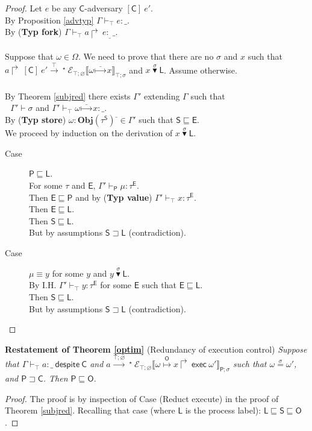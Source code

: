 \documentclass{sigplanconf}
\newcommand{\lab}{\mathsf L}
\newcommand{\labp}{\mathsf P}
\newcommand{\labo}{\mathsf O}
\newcommand{\labb}{\mathsf S}
\newcommand{\labt}{\mathsf E}
\newcommand{\labc}{\mathsf C}
\newcommand{\action}[1]{\stackrel{#1}{\longrightarrow}~}
\newcommand{\fork}[2]{#1\Rsh\:\!#2}
\newcommand{\store}[1]{\stackrel{#1}\mapsto}
\newcommand{\llctx}[3]{\mathcal E_{#1}\llbracket#2\rrbracket_{#3}}
\newcommand{\trule}[1]{(\textbf{Typ #1})}
\begin{document}
\begin{proof} Let $e$ be any $\labc$-adversary $[\labc]~e'$. \\
By Proposition \ref{advtyp} $\Gamma \vdash_{\top} e : \_$. \\
By \trule{fork} $\Gamma \vdash_\top \fork a e :_{\_} \_$. \\
\\
Suppose that $\omega \in \Omega$. We need to prove that there are no $\sigma$ and $x$ such that $\fork a [\labc]~e'\action{\top}\!\!\!\!{}^\star~ \llctx{\top;\varnothing}{\omega\store{\_} x}{\top;\sigma}$
and $x\stackrel\sigma\blacktriangledown \lab$. Assume otherwise.\\
\\
By Theorem \ref{subjred} there exists $\Gamma'$ extending $\Gamma$ such that \\
$~~~\Gamma' \vdash \sigma$ and $\Gamma' \vdash_\top \omega \store\_ x : \_$.\\
By \trule{store} $\omega : \mathbf{Obj}(\tau^{\labb})^\_ \in \Gamma'$ such that $\labb \sqsubseteq \labt$.\\
We proceed by induction on the derivation of $x\stackrel\sigma\blacktriangledown \lab$.
\begin{description}
\item[Case] $\labp \sqsubseteq \lab$.\\
For some $\tau$ and $\labt$, $\Gamma' \vdash_{\labp} \mu : \tau^{\labt}$.\\
Then $\labt \sqsubseteq \labp$ and by \trule{value} $\Gamma' \vdash_{\top} x : \tau^{\labt}$.\\
Then $\labt \sqsubseteq \lab$.\\
Then $\labb \sqsubseteq \lab$.\\
But by assumptions $\labb \sqsupset \lab$ (contradiction).
\item[Case] $\mu \equiv y$ for some $y$ and $y\stackrel\sigma\blacktriangledown \lab$.\\
By I.H. $\Gamma' \vdash_{\top} y : \tau^{\labt}$ for some $\labt$ such that $\labt \sqsubseteq \lab$.\\
Then $\labb \sqsubseteq \lab$.\\
But by assumptions $\labb \sqsupset \lab$ (contradiction). \qedhere
\end{description}
\end{proof}
\noindent
{\bf Restatement of Theorem \ref{optim}} (Redundancy of execution control) {\em Suppose that $\Gamma \vdash_{\top} a : \_ ~\mathsf{despite}~\labc$ and  
$a \action{\top;\varnothing}\!\!\!\!{}^\star ~\llctx{\top;\varnothing}{\fork{\omega \store{\labo} x} \mathsf{exec}\:\omega'}{\labp;\sigma}$ such that $\omega \stackrel\sigma= \omega'$, and $\labp \sqsupset\labc$. Then $\labp \sqsubseteq \labo$.
}
\begin{proof} The proof is by inspection of Case (Reduct execute) in the proof of Theorem \ref{subjred}. Recalling that case (where $\lab$ is the process label): $\lab \sqsubseteq \labb \sqsubseteq \labo$.
\end{proof}
\end{document}

